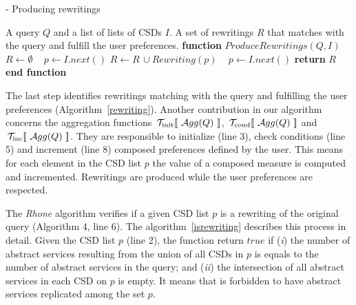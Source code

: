 \begin{algorithm}
\caption{ - Producing rewritings}
\label{rewriting}
\begin{algorithmic}[1]
\REQUIRE A query $Q$ and a list of lists of CSDs $I$.
\ENSURE A set of rewritings $R$ that matches with the query and fulfill the user preferences.
\STATE \textbf{function} $\mathit{ProduceRewritings} (Q, I)$
	\STATE $R\leftarrow \emptyset$
	\STATE ~\! 
    \STATE $p \leftarrow I.next()$
			\STATE $R\leftarrow R\,\cup \mathit{Rewriting}(p)$
			\STATE ~\!
		\ENDIF
		\STATE $p \leftarrow I.\mathit{next}()$
	\ENDWHILE
    \STATE \textbf{return} $R$
\STATE \textbf{end function}
\end{algorithmic}
\end{algorithm}

%
The last step identifies rewritings matching with the query and fulfilling the user preferences (Algorithm~\ref{rewriting}). %
%
%
Another contribution in our algorithm concerns the aggregation functions $~\!\hbox{${\cal T}_{\mathrm{init}} [\![\ {\cal A}{gg}(Q)\ ]\!]$}$, $~\!\hbox{${\cal T}_{\mathrm{cond}} [\![\ {\cal A}{gg}(Q)\ ]\!]$}$ and $~\!\hbox{${\cal T}_{\mathrm{inc}} [\![\ {\cal A}{gg}(Q)\ ]\!]$}$.
They are responsible to initialize (line 3), check conditions (line 5) and increment (line 8) composed preferences defined by the user.
This means for each element in the CSD list $p$ the value of a composed measure is computed and incremented. 
Rewritings are produced while the user preferences are respected. 

The \textit{Rhone} algorithm verifies if a given CSD list $p$ is a rewriting
of the original query (Algorithm 4, line 6).
The algorithm~\ref{isrewriting} describes this process in detail. 
Given the CSD list $p$ (line 2), the function return $true$ if (\textit{i}) the number of
abstract services resulting from the union of all CSDs in $p$ is equals to
the number of abstract services in the query; and (\textit{ii}) the intersection
of all abstract services in each CSD on $p$ is empty.
It means that is forbidden to have abstract services replicated among the set $p$.

